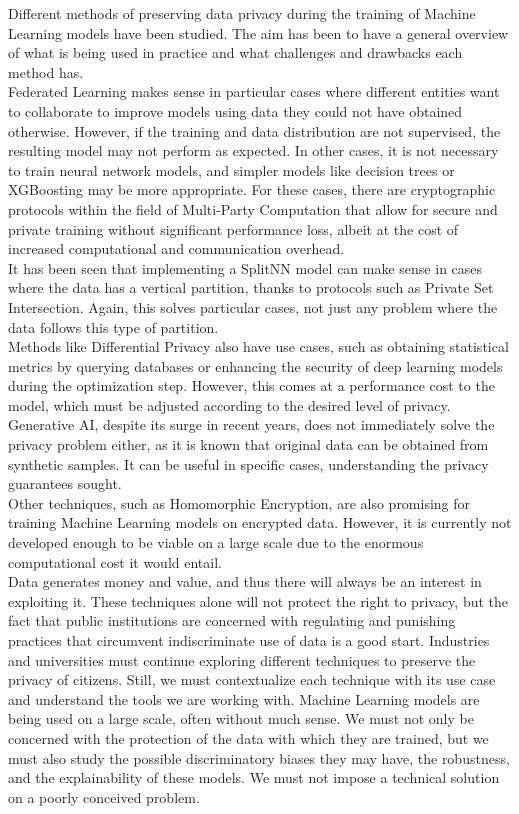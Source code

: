 Different methods of preserving data privacy during the training of Machine Learning models have been studied. The aim has been to have a general overview of what is being used in practice and what challenges and drawbacks each method has.\\
Federated Learning makes sense in particular cases where different entities want to collaborate to improve models using data they could not have obtained otherwise. However, if the training and data distribution are not supervised, the resulting model may not perform as expected. In other cases, it is not necessary to train neural network models, and simpler models like decision trees or XGBoosting may be more appropriate. For these cases, there are cryptographic protocols within the field of Multi-Party Computation that allow for secure and private training without significant performance loss, albeit at the cost of increased computational and communication overhead.\\
It has been seen that implementing a SplitNN model can make sense in cases where the data has a vertical partition, thanks to protocols such as Private Set Intersection. Again, this solves particular cases, not just any problem where the data follows this type of partition.\\
Methods like Differential Privacy also have use cases, such as obtaining statistical metrics by querying databases or enhancing the security of deep learning models during the optimization step. However, this comes at a performance cost to the model, which must be adjusted according to the desired level of privacy. Generative AI, despite its surge in recent years, does not immediately solve the privacy problem either, as it is known that original data can be obtained from synthetic samples. It can be useful in specific cases, understanding the privacy guarantees sought.\\

Other techniques, such as Homomorphic Encryption, are also promising for training Machine Learning models on encrypted data. However, it is currently not developed enough to be viable on a large scale due to the enormous computational cost it would entail.\\
Data generates money and value, and thus there will always be an interest in exploiting it. These techniques alone will not protect the right to privacy, but the fact that public institutions are concerned with regulating and punishing practices that circumvent indiscriminate use of data is a good start. Industries and universities must continue exploring different techniques to preserve the privacy of citizens. Still, we must contextualize each technique with its use case and understand the tools we are working with. Machine Learning models are being used on a large scale, often without much sense. We must not only be concerned with the protection of the data with which they are trained, but we must also study the possible discriminatory biases they may have, the robustness, and the explainability of these models. We must not impose a technical solution on a poorly conceived problem.
